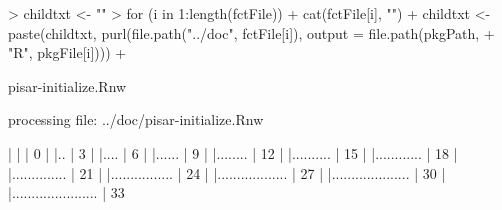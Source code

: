 \documentclass[a4paper,12pt]{article}\usepackage[]{graphicx}\usepackage[]{color}
\begin{document}
\begin{Schunk}
\begin{Sinput}
> childtxt <- ""
> for (i in 1:length(fctFile)) {
+     cat(fctFile[i], "\n")
+     childtxt <- paste(childtxt, purl(file.path("../doc", fctFile[i]), output = file.path(pkgPath, 
+         "R", pkgFile[i])))
+ }
\end{Sinput}
\begin{Soutput}
pisar-initialize.Rnw 
\end{Soutput}
\begin{Soutput}


processing file: ../doc/pisar-initialize.Rnw
\end{Soutput}
\begin{Soutput}

  |                                                                       
  |                                                                 |   0%
  |                                                                       
  |..                                                               |   3%
  |                                                                       
  |....                                                             |   6%
  |                                                                       
  |......                                                           |   9%
  |                                                                       
  |........                                                         |  12%
  |                                                                       
  |..........                                                       |  15%
  |                                                                       
  |............                                                     |  18%
  |                                                                       
  |..............                                                   |  21%
  |                                                                       
  |................                                                 |  24%
  |                                                                       
  |..................                                               |  27%
  |                                                                       
  |....................                                             |  30%
  |                                                                       
  |......................                                           |  33%

\end{Soutput}
\end{Schunk}
\end{document}
